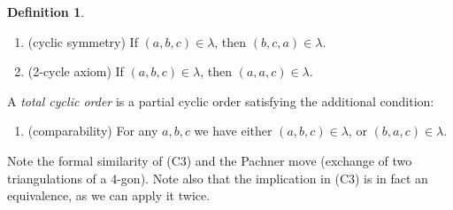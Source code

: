 \documentclass[english,11pt,leqno]{article}
\theoremstyle{definition}
\newtheorem{defi}[thm]{Definition}
\theoremstyle{remark}
\numberwithin{equation}{section}
\begin{document}
\begin{defi}
\begin{enumerate}[label=(C\arabic{*})]
\[\begin{tikzpicture}
\node(A) at (4.5,0) (arrow) {$\Rightarrow$} ;


\node (O') at (9,0) (origin') {}; 
\node [xshift=9cm] (Pa') at (0:2cm)  { $a$}; 
 \node  [xshift=9cm] (Pb') at (3.5*72:2cm) {$b$}; 
 \node [xshift=9cm] (Pc') at (2.2*72:2cm) {$c$}; 
\node [xshift=9cm] (Pd') at (1*72:2cm) {$d$};
 
 \draw[ 
        decoration={markings, mark=at position 0.125 with {\arrow{<}},
        mark=at position 0.35 with {\arrow{<}},
        mark=at position 0.6 with {\arrow{<}},
        mark=at position 0.85 with {\arrow{<}}
        },
        postaction={decorate}, dotted
        ]
 (origin') circle (2cm);
 
 \draw (node cs:name=Pa') --(node cs:name=Pb');
  \draw (node cs:name=Pb') --(node cs:name=Pc');
   \draw (node cs:name=Pc') --(node cs:name=Pd');
    \draw (node cs:name=Pa') --(node cs:name=Pd');
 \draw (node cs:name=Pb') --(node cs:name=Pd');
 
            
 \end{tikzpicture}
\]
 
 \item (cyclic symmetry) If $(a,b,c)\in\lambda$, then $(b,c,a)\in\lambda$. 
 
 \item (2-cycle axiom) If $(a,b,c)\in\lambda$, then $(a, a, c)\in\lambda$.
 
\end{enumerate}
A {\em total cyclic order} is a partial cyclic order satisfying the additional condition:
\begin{enumerate}[resume,label=(C\arabic{*})]
\item (comparability) For any $a,b,c$ we have either $(a,b,c)\in\lambda$, or $(b,a,c)\in\lambda$. 
\end{enumerate}
\end{defi}

Note the formal similarity of (C3) and  the Pachner move (exchange of two triangulations of a 4-gon).
 Note also that the implication in (C3)
is in fact an equivalence, as we can apply it twice. 
 
\end{document}
